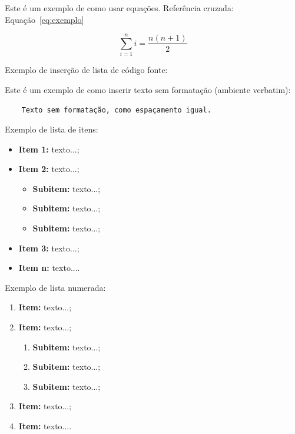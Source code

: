 Este é um exemplo de como usar equações. Referência cruzada: Equação~\ref{eq:exemplo}

\begin{equation}
\sum_{i=1}^{n} i = \frac{n(n+1)}{2}
\label{eq:exemplo}
\end{equation}


Exemplo de inserção de lista de código fonte:

 



Este é um exemplo de como inserir texto sem formatação (ambiente verbatim):

\begin{verbatim}
	Texto sem formatação, como espaçamento igual.
\end{verbatim}


Exemplo de lista de itens:

\begin{itemize}
	\item \textbf{Item 1:} texto...;
	\item \textbf{Item 2:} texto...;
    \begin{itemize}
            \item \textbf{Subitem:} texto...;
            \item \textbf{Subitem:} texto...;
            \item \textbf{Subitem:} texto...;
        \end{itemize}
	\item \textbf{Item 3:} texto...;
	\item \textbf{Item n:} texto....
\end{itemize}


Exemplo de lista numerada:

\begin{enumerate}
	\item \textbf{Item:} texto...;
	\item \textbf{Item:} texto...;
    \begin{enumerate}
        \item \textbf{Subitem:} texto...;
        \item \textbf{Subitem:} texto...;
        \item \textbf{Subitem:} texto...;
    \end{enumerate}
	\item \textbf{Item:} texto...;
	\item \textbf{Item:} texto....
\end{enumerate}


